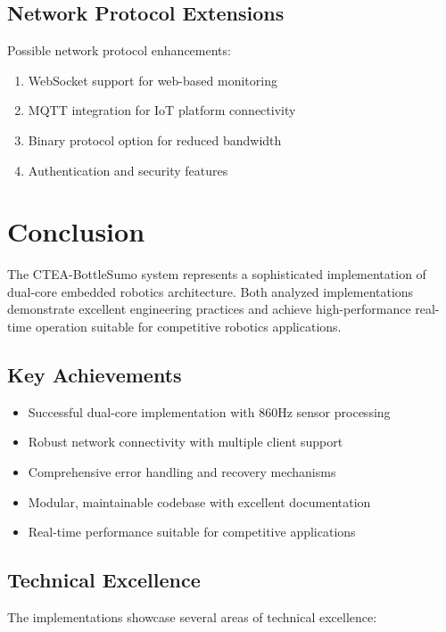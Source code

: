 \documentclass[12pt,a4paper]{article}
\begin{document}
\subsection{Network Protocol Extensions}

Possible network protocol enhancements:

\begin{enumerate}
    \item WebSocket support for web-based monitoring
    \item MQTT integration for IoT platform connectivity
    \item Binary protocol option for reduced bandwidth
    \item Authentication and security features
\end{enumerate}

\section{Conclusion}

The CTEA-BottleSumo system represents a sophisticated implementation of dual-core embedded robotics architecture. Both analyzed implementations demonstrate excellent engineering practices and achieve high-performance real-time operation suitable for competitive robotics applications.

\subsection{Key Achievements}

\begin{itemize}
    \item Successful dual-core implementation with 860Hz sensor processing
    \item Robust network connectivity with multiple client support
    \item Comprehensive error handling and recovery mechanisms
    \item Modular, maintainable codebase with excellent documentation
    \item Real-time performance suitable for competitive applications
\end{itemize}

\subsection{Technical Excellence}

The implementations showcase several areas of technical excellence:
\end{document}
